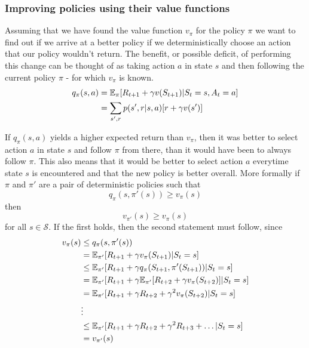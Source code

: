 \documentclass[11pt]{article}
\begin{document}
\subsubsection{Improving policies using their value functions}

Assuming that we have found the value function $v_\pi$ for
the policy $\pi$ we want to find out if we arrive at a better policy if
we deterministically choose an action that our policy wouldn't
return\cite{RLbook}.
The benefit, or possible deficit, of performing this change can be thought of
as taking action $a$ in state $s$ and then following the current policy $\pi$
- for which $v_\pi$ is known.
\begin{equation}
    \begin{aligned}
        q_\pi(s, a) & = \mathbb{E}_\pi[R_{t+1} + \gamma v(S_{t+1}) | S_t = s, A_t = a] \\
        & = \sum\limits_{s', r}p(s', r | s, a)[r + \gamma v(s')]
    \end{aligned}
\end{equation}

If $q_\pi(s, a)$ yields a higher expected return than $v_\pi$, then it was
better to select action $a$ in state $s$ and follow $\pi$ from there,
than it would have been to always follow $\pi$.
This also means that it would be better to select action $a$
everytime state $s$ is encountered
and that the new policy is better overall.
More formally if $\pi$ and $\pi'$ are a pair of deterministic policies such that
\begin{equation}\label{qq}
    q_\pi(s, \pi'(s)) \geq v_\pi(s)
\end{equation}
then
\begin{equation}
    v_{\pi'}(s) \geq v_\pi(s)
\end{equation}
for all $s \in \mathcal{S}$\cite{RLbook}.
If the first holds, then the second statement must follow, since
\begin{equation}
    \begin{aligned}
        v_\pi(s) & \leq q_\pi(s, \pi'(s))\\
                 & = \mathbb{E}_{\pi'}[R_{t+1} + \gamma v_\pi(S_{t+1}) | S_t = s]\\
                 & \leq \mathbb{E}_{\pi'}[R_{t+1} + \gamma q_\pi(S_{t+1}, \pi'(S_{t+1})) | S_t = s]\\
                 & = \mathbb{E}_{\pi'}[R_{t+1} + \gamma \mathbb{E}_{\pi'}[R_{t+2} + \gamma v_\pi(S_{t+2})] | S_t = s]\\
                 & = \mathbb{E}_{\pi'}[R_{t+1} + \gamma R_{t+2} + \gamma^2 v_\pi(S_{t+2}) | S_t = s]\\
                 & \vdots\\
                 & \leq \mathbb{E}_{\pi'}[R_{t+1} + \gamma R_{t+2} + \gamma^2 R_{t+3} + \dots | S_t = s]\\
                 & = v_{\pi'}(s)
    \end{aligned}
\end{equation}
\end{document}
